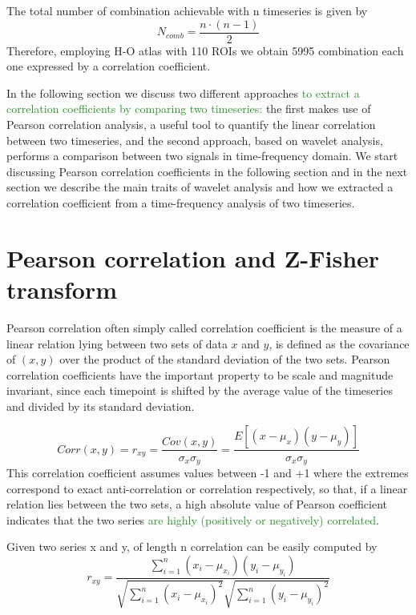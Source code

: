 \documentclass[11pt]{report}
\begin{document}
The total number of combination achievable with n timeseries is given by
\begin{equation}
N_{comb} = \frac{n\cdot(n-1)}{2}
\end{equation}
Therefore, employing H-O atlas with 110 ROIs we obtain 5995 combination each one expressed by a correlation coefficient.

In the following section we discuss two different approaches \textcolor{ForestGreen}{to extract a correlation coefficients by comparing two timeseries:} the first makes use of Pearson correlation analysis, a useful tool to quantify the linear correlation between two timeseries, and the second approach, based on wavelet analysis, performs a comparison between two signals in time-frequency domain.
We start discussing Pearson correlation coefficients in the following section and in the next section we describe the main traits of wavelet analysis and how we extracted a correlation coefficient from a time-frequency analysis of two timeseries.

\section{Pearson correlation and Z-Fisher transform}
Pearson correlation often simply called correlation coefficient is the measure of a linear relation lying between two sets of data $x$ and $y$, is defined as the covariance of $(x, y)$ over the product of the standard deviation of the two sets.
Pearson correlation coefficients have the important property to be scale and magnitude invariant, since each timepoint is shifted by the average value of the timeseries and divided by its standard deviation.

\begin{equation}
Corr(x, y) = r_{xy}=  \frac{Cov\left( x, y\right)}{\sigma_x \sigma_y} = \frac{E\left[ \left( x - \mu_x \right) \left( y - \mu_y \right)\right]}{\sigma_{x} \sigma_{y}}
\end{equation}
This correlation coefficient assumes values between -1 and +1 where the extremes correspond to exact anti-correlation or correlation respectively, so that, if a linear relation lies between the two sets, a high absolute value of Pearson coefficient indicates that the two series \textcolor{ForestGreen}{are highly  (positively or negatively) correlated}.
\cite{baldini2021}

Given two series x and y, of length n correlation can be easily computed by
\begin{equation}
r_{xy} = \frac{\sum_{i = 1}^n \left( x_i - \mu_{x_i}\right)\left( y_i - \mu_{y_i}\right)}{\sqrt{\sum_{i = 1}^n \left( x_i -\mu_{x_i}\right)^2}\sqrt{\sum_{i = 1}^n \left( y_i -\mu_{y_i}\right)^2}}
\end{equation}
\end{document}
